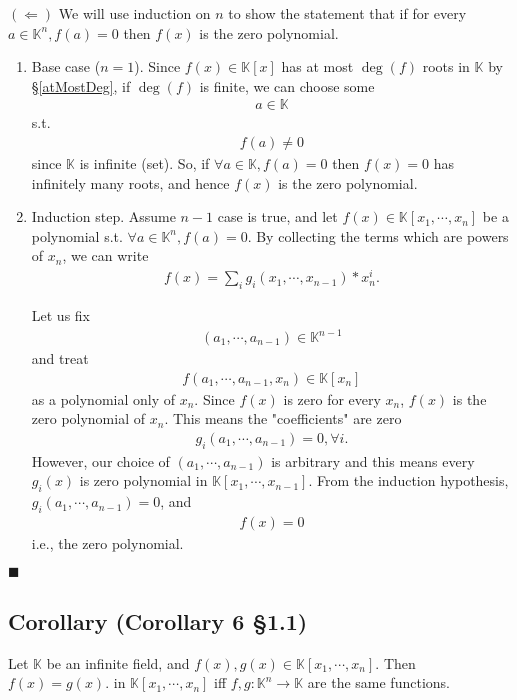 \documentclass[11pt]{book}
\begin{document}
$(\Leftarrow)$ We will use induction on $n$ to show the statement that if for every $a \in \mathbb{K}^n, f(a) = 0$ then $f(x)$ is the zero polynomial.

\begin{enumerate}
\item Base case ($n=1$).
Since $f(x) \in \mathbb{K}[x]$ has at most $\deg(f)$ roots in $\mathbb{K}$ by \S\ref{atMostDeg}, if $\deg(f)$ is finite, we can choose some
\begin{eqnarray}
a \in \mathbb{K}
\end{eqnarray}
s.t.
\begin{eqnarray}
f(a) \neq 0
\end{eqnarray}
since $\mathbb{K}$ is infinite (set).
So, if $\forall a \in \mathbb{K}, f(a) = 0$ then $f(x)=0$ has infinitely many roots, and hence $f(x)$ is the zero polynomial.

\item Induction step.
Assume $n-1$ case is true, and let $f(x) \in \mathbb{K}[x_1, \cdots, x_n]$ be a polynomial s.t. $\forall a \in \mathbb{K}^n, f(a) = 0$.
By collecting the terms which are powers of $x_n$, we can write
\begin{eqnarray}
f(x) = \sum_{i} g_i (x_1, \cdots, x_{n-1}) * x_n^i.
\end{eqnarray}

Let us fix
\begin{eqnarray}
(a_1, \cdots, a_{n-1}) \in \mathbb{K}^{n-1}
\end{eqnarray}
and treat
\begin{eqnarray}
f(a_1, \cdots, a_{n-1}, x_n) \in \mathbb{K}[x_n] 
\end{eqnarray}
as a polynomial only of $x_n$.
Since $f(x)$ is zero for every $x_n$, $f(x)$ is the zero polynomial of $x_n$.
This means the "coefficients" are zero
\begin{eqnarray}
g_i (a_1, \cdots, a_{n-1}) = 0, \forall i.
\end{eqnarray}
However, our choice of $(a_1, \cdots, a_{n-1})$ is arbitrary and this means every $g_i(x)$ is zero polynomial in $\mathbb{K}[x_1, \cdots, x_{n-1}]$.
From the induction hypothesis, $g_i (a_1, \cdots, a_{n-1}) = 0$, and
\begin{eqnarray}
f(x) = 0
\end{eqnarray}
i.e., the zero polynomial.\\
\end{enumerate}
$\blacksquare$

\subsection{Corollary (Corollary 6 \S1.1)}
Let $\mathbb{K}$ be an infinite field, and $f(x), g(x) \in  \mathbb{K}[x_1, \cdots, x_n]$.
Then $f(x) = g(x)$. in $ \mathbb{K}[x_1, \cdots, x_n]$ iff $f,g : \mathbb{K}^n \to \mathbb{K}$ are the same functions. 
\end{document}
